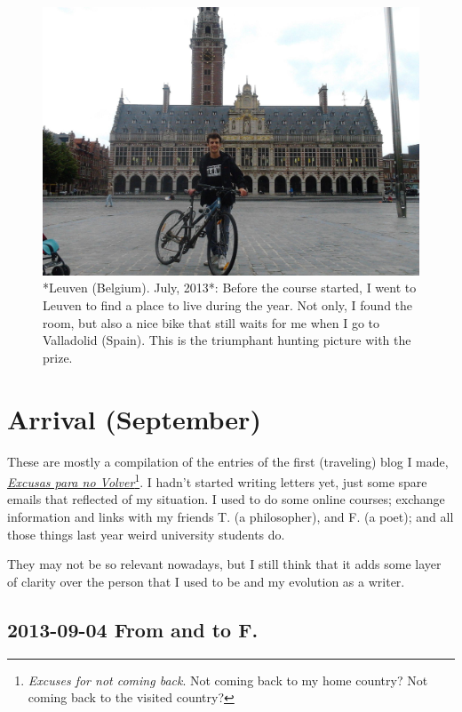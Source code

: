 \documentclass[]{book}
\let\rmarkdownfootnote\footnote%
\def\footnote{\protect\rmarkdownfootnote}
\begin{document}
\begin{figure}

{\centering \includegraphics[width=0.75\linewidth]{images/2014/library} 

}

\caption{ *Leuven (Belgium). July, 2013*: Before the course started, I went to Leuven to find a place to live during the year. Not only, I found the room, but also a nice bike that still waits for me when I go to Valladolid (Spain). This is the triumphant hunting picture with the prize.}\label{fig:library}
\end{figure}

\hypertarget{arrival}{%
\chapter*{Arrival (September)}\label{arrival}}

These are mostly a compilation of the entries of the first (traveling) blog I made, \href{http://excusasparanovolver.blogspot.com/}{\emph{Excusas para no Volver}}\footnote{\emph{Excuses for not coming back}. Not coming back to my home country? Not coming back to the visited country? }. I hadn't started writing letters yet, just some spare emails that reflected of my situation. I used to do some online courses; exchange information and links with my friends T. (a philosopher), and F. (a poet); and all those things last year weird university students do.

They may not be so relevant nowadays, but I still think that it adds some layer of clarity over the person that I used to be and my evolution as a writer.

\hypertarget{fromtoF20130904}{%
\section*{2013-09-04 From and to F.}\label{fromtoF20130904}}
\end{document}
